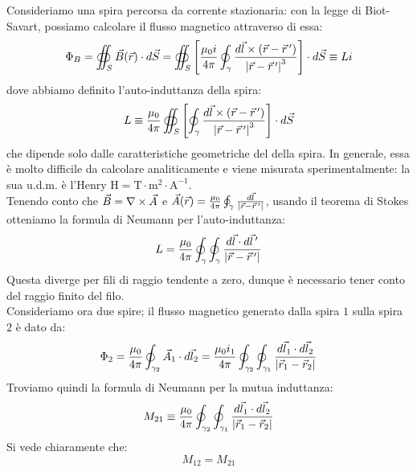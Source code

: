 Consideriamo una spira percorsa da corrente stazionaria: con la legge di Biot-Savart, possiamo calcolare il flusso magnetico attraverso di essa:
\begin{equation}
	\Phi_B = \oiint_S \vec{B}(\vec{r}) \cdot d\vec{S} = \oiint_S \left[ \frac{\mu_0 i}{4\pi} \oint_{\gamma} \frac{d\vec{l} \times (\vec{r} - \vec{r}\,')}{\left\lvert\vec{r}-\vec{r}\,'\right\rvert^3} \right]\cdot d\vec{S} \equiv Li
	\label{eq:17}
\end{equation}
dove abbiamo definito l'auto-induttanza della spira:
\begin{equation}
	L \equiv \frac{\mu_0}{4\pi} \oiint_S \left[ \oint_{\gamma} \frac{d\vec{l} \times (\vec{r} - \vec{r}\,')}{\left\lvert\vec{r}-\vec{r}\,'\right\rvert^3} \right] \cdot d\vec{S}
	\label{eq:18}
\end{equation}
che dipende solo dalle caratteristiche geometriche del della spira. In generale, essa è molto difficile da calcolare analiticamente e viene misurata sperimentalmente: la sua u.d.m. è l'Henry $ \text{H} = \text{T}\cdot\text{m}^2\cdot\text{A}^{-1} $. \\ 
%
Tenendo conto che $ \vec{B} = \nabla\times\vec{A} $ e $ \vec{A}(\vec{r}) = \frac{\mu_0}{4\pi} \oint_{\gamma} \frac{d\vec{l}}{\left\lvert\vec{r} - \vec{r}\,'\right\rvert} $, usando il teorema di Stokes otteniamo la formula di Neumann per l'auto-induttanza:
\begin{equation}
	L = \frac{\mu_0}{4\pi} \oint_{\gamma} \oint_{\gamma} \frac{d\vec{l}\cdot d\vec{l}\,'}{\left\lvert\vec{r} - \vec{r}\,'\right\rvert}
	\label{eq:19}
\end{equation}
Questa diverge per fili di raggio tendente a zero, dunque è necessario tener conto del raggio finito del filo. \\ 
%
Consideriamo ora due spire; il flusso magnetico generato dalla spira $ 1 $ sulla spira $ 2 $ è dato da:
\begin{equation}
	\Phi_2 = \frac{\mu_0}{4\pi} \oint_{\gamma_2} \vec{A}_1 \cdot d\vec{l}_2 = \frac{\mu_0 i_1}{4\pi} \oint_{\gamma_2} \oint_{\gamma_1} \frac{d\vec{l}_1 \cdot d\vec{l}_2}{\left\lvert\vec{r}_1 - \vec{r}_2\right\rvert}
	\label{eq:20}
\end{equation}
Troviamo quindi la formula di Neumann per la mutua induttanza:
\begin{equation}
	M_{21} \equiv \frac{\mu_0 }{4\pi} \oint_{\gamma_2} \oint_{\gamma_1} \frac{d\vec{l}_1 \cdot d\vec{l}_2}{\left\lvert\vec{r}_1 - \vec{r}_2\right\rvert}
	\label{eq:21}
\end{equation}
Si vede chiaramente che:
\begin{equation}
	M_{12} = M_{21}
	\label{eq:22}
\end{equation}
